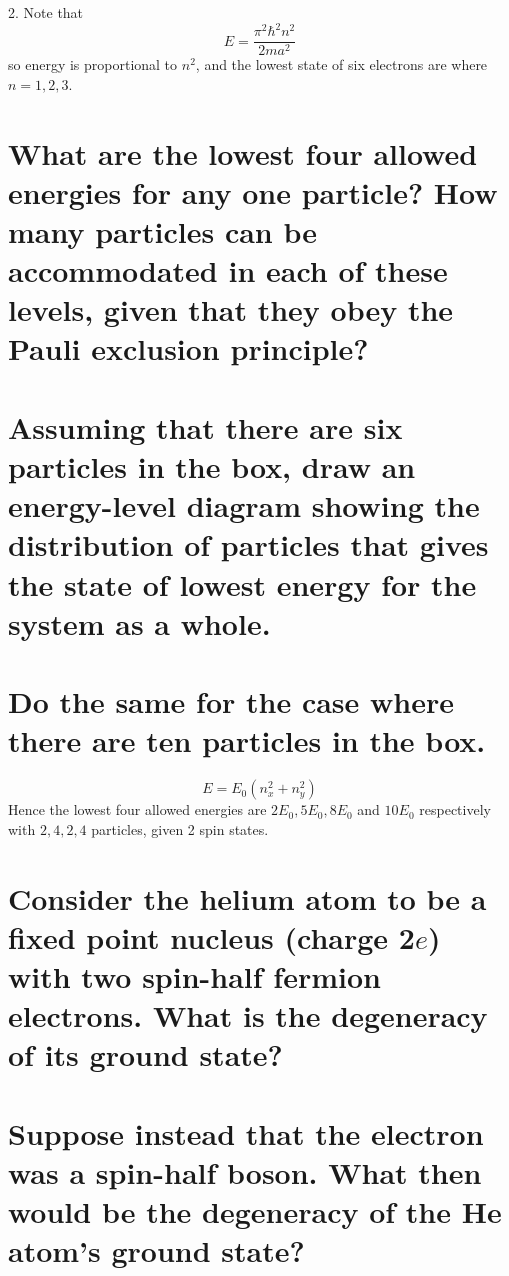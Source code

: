 \documentclass[answers]{exam}
\begin{document}
\begin{questions}
\begin{solution}
	2. Note that
	$$E = \frac{\pi^2\hbar^2n^2}{2ma^2}$$
	so energy is proportional to $n^2$, and the lowest state of six electrons are where $n=1,2,3$.
\end{solution}


\begin{parts}
	\part{What are the lowest four allowed energies for any one particle? How many particles can be accommodated in each of these levels, given that they obey the Pauli exclusion principle?}
	\part{Assuming that there are six particles in the box, draw an energy-level diagram showing the distribution of particles that gives the state of lowest energy for the system as a whole.}
	\part{Do the same for the case where there are ten particles in the box.}
\end{parts}

\begin{solution}
	$$E = E_0(n_x^2 + n_y^2)$$
	Hence the lowest four allowed energies are $2E_0, 5E_0, 8E_0$ and $10E_0$ respectively with $2, 4, 2, 4$ particles, given 2 spin states.
\end{solution}

\question{}

\begin{parts}
	\part{Consider the helium atom to be a fixed point nucleus (charge 2$e$) with two spin-half fermion electrons. What is the degeneracy of its ground state?}
	\part{Suppose instead that the electron was a spin-half boson. What then would be the degeneracy of the He atom's ground state?}

\end{parts}
\end{questions}
\end{document}

